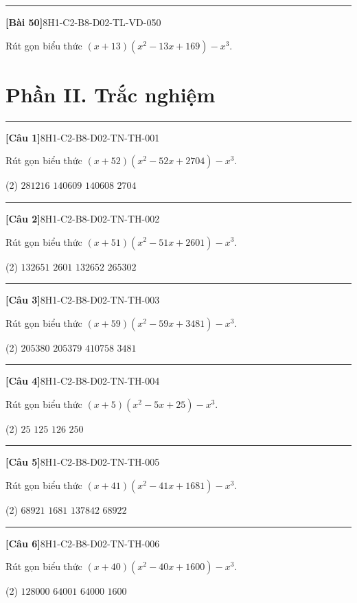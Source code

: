 \documentclass[12pt,a4paper]{article}
\newif\ifloigiai
\newenvironment{cauhoi}[2]{%
  \par\medskip\noindent\rule{\textwidth}{0.4pt}\par\nopagebreak
  \noindent\textbf{[#1]}\hfill{\scriptsize\ttfamily #2}\par\nopagebreak\smallskip}{\par}
\newcommand{\loigiai}[1]{\ifloigiai\par\smallskip\noindent\textit{Lời giải.} #1\par\fi}
\newcommand{\dapan}[1]{\ifloigiai\par\smallskip\noindent\textit{Đáp án:} \textbf{#1}\par\fi}
\begin{document}
\begin{cauhoi}{Bài 50}{8H1-C2-B8-D02-TL-VD-050}
Rút gọn biểu thức $(x+13)(x^{2}-13x+169)-x^{3}$.
\loigiai{Ta có $(x+13)(x^{2}-13x+169)=x^{3}+2197$ nên biểu thức bằng $x^{3}+2197-x^{3}=2197$.}
\end{cauhoi}
\clearpage\section*{Phần II. Trắc nghiệm}
\begin{cauhoi}{Câu 1}{8H1-C2-B8-D02-TN-TH-001}
Rút gọn biểu thức $(x+52)(x^{2}-52x+2704)-x^{3}$.
\begin{tasks}(2)
\task $281216$
\task $140609$
\task $140608$
\task $2704$
\end{tasks}
\dapan{C}
\end{cauhoi}
\begin{cauhoi}{Câu 2}{8H1-C2-B8-D02-TN-TH-002}
Rút gọn biểu thức $(x+51)(x^{2}-51x+2601)-x^{3}$.
\begin{tasks}(2)
\task $132651$
\task $2601$
\task $132652$
\task $265302$
\end{tasks}
\dapan{A}
\end{cauhoi}
\begin{cauhoi}{Câu 3}{8H1-C2-B8-D02-TN-TH-003}
Rút gọn biểu thức $(x+59)(x^{2}-59x+3481)-x^{3}$.
\begin{tasks}(2)
\task $205380$
\task $205379$
\task $410758$
\task $3481$
\end{tasks}
\dapan{B}
\end{cauhoi}
\begin{cauhoi}{Câu 4}{8H1-C2-B8-D02-TN-TH-004}
Rút gọn biểu thức $(x+5)(x^{2}-5x+25)-x^{3}$.
\begin{tasks}(2)
\task $25$
\task $125$
\task $126$
\task $250$
\end{tasks}
\dapan{B}
\end{cauhoi}
\begin{cauhoi}{Câu 5}{8H1-C2-B8-D02-TN-TH-005}
Rút gọn biểu thức $(x+41)(x^{2}-41x+1681)-x^{3}$.
\begin{tasks}(2)
\task $68921$
\task $1681$
\task $137842$
\task $68922$
\end{tasks}
\dapan{A}
\end{cauhoi}
\begin{cauhoi}{Câu 6}{8H1-C2-B8-D02-TN-TH-006}
Rút gọn biểu thức $(x+40)(x^{2}-40x+1600)-x^{3}$.
\begin{tasks}(2)
\task $128000$
\task $64001$
\task $64000$
\task $1600$
\end{tasks}
\dapan{C}
\end{cauhoi}
\end{document}
